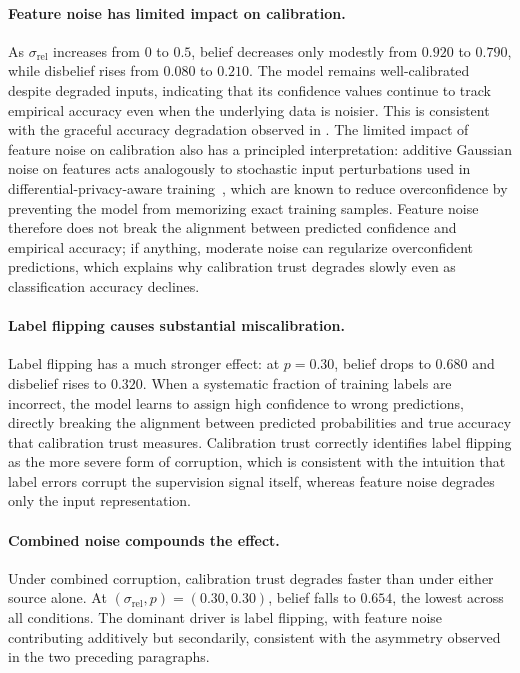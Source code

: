 \paragraph{Feature noise has limited impact on calibration.}
As $\sigma_{\text{rel}}$ increases from $0$ to $0.5$, belief decreases only modestly from $0.920$ to $0.790$, while disbelief rises from $0.080$ to $0.210$. The model remains well-calibrated despite degraded inputs, indicating that its confidence values continue to track empirical accuracy even when the underlying data is noisier. This is consistent with the graceful accuracy degradation observed in . The limited impact of feature noise on calibration also has a principled interpretation: additive Gaussian noise on features acts analogously to stochastic input perturbations used in differential-privacy-aware training~\cite{Abadi_2016}, which are known to reduce overconfidence by preventing the model from memorizing exact training samples. Feature noise therefore does not break the alignment between predicted confidence and empirical accuracy; if anything, moderate noise can regularize overconfident predictions, which explains why calibration trust degrades slowly even as classification accuracy declines.


\paragraph{Label flipping causes substantial miscalibration.}
Label flipping has a much stronger effect: at $p = 0.30$, belief drops to $0.680$ and disbelief rises to $0.320$. When a systematic fraction of training labels are incorrect, the model learns to assign high confidence to wrong predictions, directly breaking the alignment between predicted probabilities and true accuracy that calibration trust measures. Calibration trust correctly identifies label flipping as the more severe form of corruption, which is consistent with the intuition that label errors corrupt the supervision signal itself, whereas feature noise degrades only the input representation.


\paragraph{Combined noise compounds the effect.}
Under combined corruption, calibration trust degrades faster than under either source alone. At $(\sigma_{\text{rel}}, p) = (0.30, 0.30)$, belief falls to $0.654$, the lowest across all conditions. The dominant driver is label flipping, with feature noise contributing additively but secondarily, consistent with the asymmetry observed in the two preceding paragraphs.


